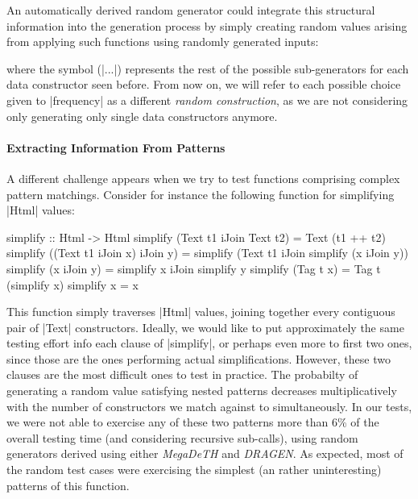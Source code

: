 An automatically derived random generator could integrate this structural
information into the generation process by simply creating random values arising
from applying such functions using randomly generated inputs:


where the symbol (|...|) represents the rest of the possible sub-generators for
each data constructor seen before.
%
From now on, we will refer to each possible choice given to |frequency| as a
different \emph{random construction}, as we are not considering only generating
only single data constructors anymore.

%
\paragraph{Extracting Information From Patterns}

A different challenge appears when we try to test functions comprising complex
pattern matchings. Consider for instance the following function for simplifying
|Html| values:

\begin{code}
simplify :: Html -> Html
simplify (Text t1 iJoin Text t2) = Text (t1 ++ t2)
simplify ((Text t1 iJoin x) iJoin y)
  = simplify (Text t1 iJoin simplify (x iJoin y))
simplify (x iJoin y) = simplify x iJoin simplify y
simplify (Tag t x) = Tag t (simplify x)
simplify x = x
\end{code}

This function simply traverses |Html| values, joining together every contiguous
pair of |Text| constructors.
%
Ideally, we would like to put approximately the same testing effort info each
clause of |simplify|, or perhaps even more to first two ones, since those are
the ones performing actual simplifications.
%
However, these two clauses are the most difficult ones to test in practice.
%
The probabilty of generating a random value satisfying nested patterns decreases
multiplicatively with the number of constructors we match against to
simultaneously.
%
In our tests, we were not able to exercise any of these two patterns more than
6\% of the overall testing time (and considering recursive sub-calls), using
random generators derived using either \emph{MegaDeTH} and \emph{DRAGEN}.
%
As expected, most of the random test cases were exercising the simplest (an
rather uninteresting) patterns of this function.


